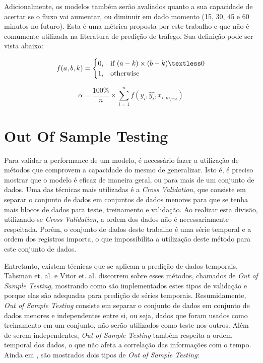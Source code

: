 Adicionalmente, os modelos também serão avaliados quanto a sua capacidade de acertar se o fluxo vai aumentar, ou diminuir em dado momento (15, 30, 45 e 60 minutos no futuro). Esta é uma métrica proposta por este trabalho e que não é comumente utilizada na literatura de predição de tráfego. Sua definição pode ser vista abaixo:

\begin{equation}
f(a, b, k) =
\begin{cases}
  0, & \text{if}\ (a - k) \times (b - k) \textless 0 \\
  1, & \text{otherwise}
\end{cases}
\end{equation}

\begin{equation}
\alpha = \frac{100\%}{n} \times \sum_{i=1}^{n} f(y_i, \hat{y_i}, x_{i, m_{flow}})
\end{equation}

\section{Out Of Sample Testing}

Para validar a performance de um modelo, é necessário fazer a utilização de métodos que comprovem a capacidade do mesmo de generalizar. Isto é, é preciso mostrar que o modelo é eficaz de maneira geral, ou para mais de um conjunto de dados. Uma das técnicas mais utilizadas é a \textit{Cross Validation}, que consiste em separar o conjunto de dados em conjuntos de dados menores para que se tenha mais blocos de dados para teste, treinamento e validação. Ao realizar esta divisão, utilizando-se \textit{Cross Validation}, a ordem dos dados não é necessariamente respeitada. Porém, o conjunto de dados deste trabalho é uma série temporal e a ordem dos registros importa, o que impossibilita a utilização deste método para este conjunto de dados. 

Entretanto, existem técnicas que se aplicam a predição de dados temporais. Tahsman et. al. \cite{Tashman_2000} e Vitor et. al. \cite{Vitor_2019} discorrem sobre esses métodos, chamados de \textit{Out of Sample Testing}, mostrando como são implementados estes tipos de validação e porque elas são adequadas para predição de séries temporais. Resumidamente, \textit{Out of Sample Testing} consiste em separar o conjunto de dados em conjunto de dados menores e independentes entre si, ou seja, dados que foram usados como treinamento em um conjunto, não serão utilizados como teste nos outros. Além de serem independentes, \textit{Out of Sample Testing} também respeita a ordem temporal dos dados, o que não afeta a correlação das informações com o tempo. Ainda em \cite{Tashman_2000}, são mostrados dois tipos de \textit{Out of Sample Testing}:

